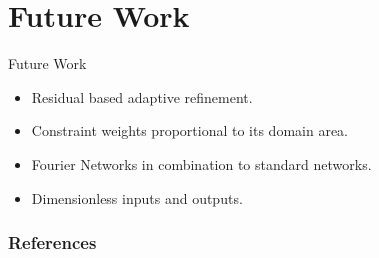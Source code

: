 \documentclass{beamer}
\begin{document}
\section{Future Work}

\begin{frame}{Future Work}

\begin{itemize}
    \item Residual based adaptive refinement.
    \item Constraint weights proportional to its domain area.
    \item Fourier Networks in combination to standard networks.
    \item Dimensionless inputs and outputs.
\end{itemize}

\end{frame}



\begin{frame}[allowframebreaks]
\frametitle{References}
\tiny
\nocite{*}
\printbibliography
\end{frame}
\end{document}
